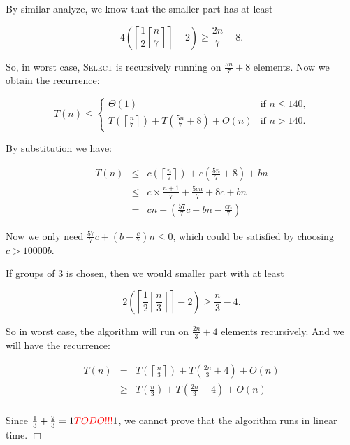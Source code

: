 \documentclass[a4paper,10pt]{article}
\newcommand{\qed}{\hfill \ensuremath{\Box}}
\newcommand{\nless}{\textcolor{red}{TODO!!!}{} }
\begin{document}
By similar analyze, we know that the smaller part has at least

$$ 4\left(\left\lceil\frac{1}{2}\left\lceil\frac{n}{7}\right\rceil\right\rceil-2\right)\geq \frac{2n}{7} - 8.$$

So, in worst case, \textsc{Select} is recursively running on $\frac{5n}{7} + 8$ elements. Now we obtain the recurrence:

\begin{equation*}
T(n) \leq \left\{
  \begin{array}{ll}
    \Theta(1)     & \text{if $n \leq 140$,}\\
    T\left(\left\lceil\frac{n}{7}\right\rceil\right) + T\left(\frac{5n}{7} + 8\right) + O(n) & \text{if $n > 140$.}
  \end{array}
\right.
\end{equation*}

By substitution we have:

\begin{eqnarray*}
T(n)  &\leq& c\left(\left\lceil\frac{n}{7}\right\rceil\right) + c\left(\frac{5n}{7} + 8\right) + bn\\
&\leq& c\times\frac{n + 1}{7} + \frac{5cn}{7} + 8c + bn\\
&=&cn + \left(\frac{57}{7} c + bn - \frac{cn}{7}\right)
\end{eqnarray*}

Now we only need $\frac{57}{7} c + \left(b - \frac{c}{7}\right)n \leq 0$, which could be satisfied by choosing $c > 10000b$.

If groups of 3 is chosen, then we would smaller part with at least

$$2\left(\left\lceil\frac{1}{2}\left\lceil\frac{n}{3}\right\rceil\right\rceil -2\right) \geq \frac{n}{3} - 4.$$

So in worst case, the algorithm will run on $\frac{2n}{3} + 4$ elements recursively. And we will have the recurrence:

\begin{eqnarray*}
T(n) &=& T\left(\left\lceil\frac{n}{3}\right\rceil\right) + T\left(\frac{2n}{3} + 4\right) + O(n)\\
&\geq& T\left(\frac{n}{3}\right) + T\left(\frac{2n}{3} + 4\right) + O(n)\\
\end{eqnarray*}

Since $\frac{1}{3} + \frac{2}{3} = 1 \nless 1$,  we cannot prove that the algorithm runs in linear time.
\qed
\end{document}
